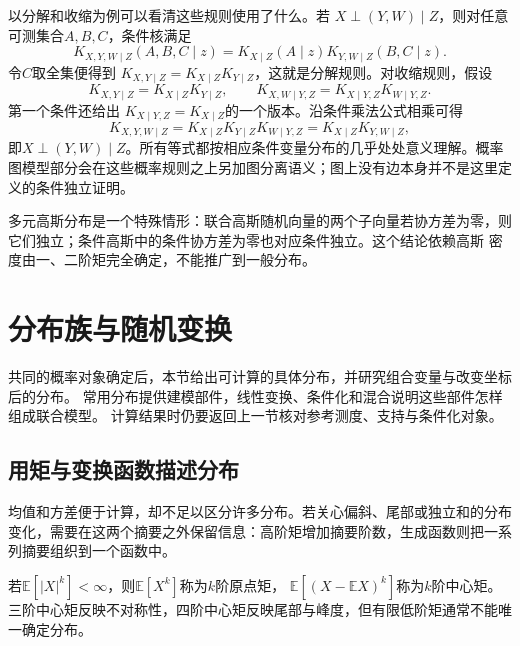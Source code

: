 以分解和收缩为例可以看清这些规则使用了什么。若
\(X\perp(Y,W)\mid Z\)，则对任意可测集合\(A,B,C\)，条件核满足
\[
  K_{X,Y,W\mid Z}(A,B,C\mid z)
  =K_{X\mid Z}(A\mid z)K_{Y,W\mid Z}(B,C\mid z).
\]
令\(C\)取全集便得到
\(K_{X,Y\mid Z}=K_{X\mid Z}K_{Y\mid Z}\)，这就是分解规则。对收缩规则，假设
\[
  K_{X,Y\mid Z}=K_{X\mid Z}K_{Y\mid Z},
  \qquad
  K_{X,W\mid Y,Z}=K_{X\mid Y,Z}K_{W\mid Y,Z}.
\]
第一个条件还给出
\(K_{X\mid Y,Z}=K_{X\mid Z}\)的一个版本。沿条件乘法公式相乘可得
\[
  K_{X,Y,W\mid Z}
  =K_{X\mid Z}K_{Y\mid Z}K_{W\mid Y,Z}
  =K_{X\mid Z}K_{Y,W\mid Z},
\]
即\(X\perp(Y,W)\mid Z\)。所有等式都按相应条件变量分布的几乎处处意义理解。概率图模型部分会在这些概率规则之上另加图分离语义；图上没有边本身并不是这里定义的条件独立证明。

多元高斯分布是一个特殊情形：联合高斯随机向量的两个子向量若协方差为零，则它们独立；条件高斯中的条件协方差为零也对应条件独立。这个结论依赖高斯
密度由一、二阶矩完全确定，不能推广到一般分布。

\section{分布族与随机变换}
\label{sec:probability-families-transformations}

共同的概率对象确定后，本节给出可计算的具体分布，并研究组合变量与改变坐标后的分布。
常用分布提供建模部件，线性变换、条件化和混合说明这些部件怎样组成联合模型。
计算结果时仍要返回上一节核对参考测度、支持与条件化对象。

\subsection{用矩与变换函数描述分布}
\label{sec:probability-moment-transforms}

均值和方差便于计算，却不足以区分许多分布。若关心偏斜、尾部或独立和的分布变化，需要在这两个摘要之外保留信息：高阶矩增加摘要阶数，生成函数则把一系列摘要组织到一个函数中。

若\(\mathbb{E}[|X|^k]<\infty\)，则\(\mathbb{E}[X^k]\)称为\(k\)阶原点矩，
\(\mathbb{E}[(X-\mathbb{E}X)^k]\)称为\(k\)阶中心矩。三阶中心矩反映不对称性，四阶中心矩反映尾部与峰度，但有限低阶矩通常不能唯一确定分布。

